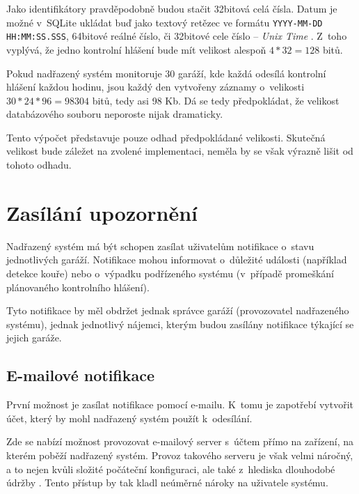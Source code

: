 Jako identifikátory pravděpodobně budou stačit 32bitová celá čísla. Datum je možné v~SQLite ukládat buď jako textový retězec ve formátu \texttt{YYYY-MM-DD HH:MM:SS.SSS}, 64bitové reálné číslo, či 32bitové cele číslo -- \textit{Unix Time} \cite{sqlite_datetypes}. Z~toho vyplývá, že jedno kontrolní hlášení bude mít velikost alespoň $4 * 32 = 128$ bitů.

Pokud nadřazený systém monitoruje 30 garáží, kde každá odesílá kontrolní hlášení každou hodinu, jsou každý den vytvořeny záznamy o~velikosti $30 * 24 * 96 = 98304$ bitů, tedy asi 98 Kb. Dá se tedy předpokládat, že velikost databázového souboru neporoste nijak dramaticky.

Tento výpočet představuje pouze odhad předpokládané velikosti. Skutečná velikost bude záležet na zvolené implementaci, neměla by se však výrazně lišit od tohoto odhadu.


\section{Zasílání upozornění}
\label{sec:an_notify}

Nadřazený systém má být schopen zasílat uživatelům notifikace o~stavu jednotlivých garáží. Notifikace mohou informovat o~důležité události (například detekce kouře) nebo o~výpadku podřízeného systému (v~případě promeškání plánovaného kontrolního hlášení).

Tyto notifikace by měl obdržet jednak správce garáží (provozovatel nadřazeného systému), jednak jednotlivý nájemci, kterým budou zasílány notifikace týkající se jejich garáže.

\subsection{E-mailové notifikace}

První možnost je zasílat notifikace pomocí e-mailu. K~tomu je zapotřebí vytvořit účet, který by mohl nadřazený systém použít k~odesílání.

Zde se nabízí možnost provozovat e-mailový server s~účtem přímo na zařízení, na kterém poběží nadřazený systém. Provoz takového serveru je však velmi náročný, a to nejen kvůli složité počáteční konfiguraci, ale také z~hlediska dlouhodobé údržby \cite{email_dont}. Tento přístup by tak kladl neúměrné nároky na uživatele systému.

